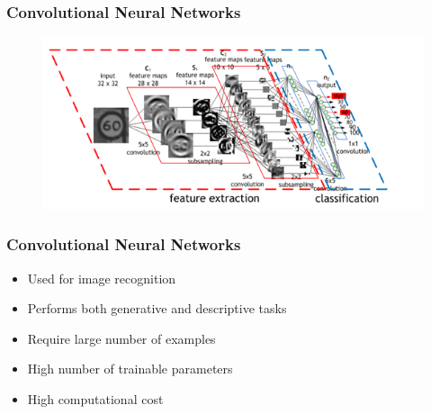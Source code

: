 \documentclass[aspectratio=169]{beamer}
\begin{document}
		\begin{frame}
			\frametitle{Convolutional Neural Networks}
			
			\begin{figure}
				\includegraphics[width=\linewidth]{images/cnn_example2.png}
			\end{figure}
		\end{frame}
		\begin{frame}
			\frametitle{Convolutional Neural Networks}

			\begin{itemize}
				\item Used for image recognition
				\item Performs both generative and descriptive tasks
			\end{itemize}

			\begin{itemize}
				\item Require large number of examples
				\item High number of trainable parameters
				\item High computational cost
			\end{itemize}

		\end{frame}
\end{document}
